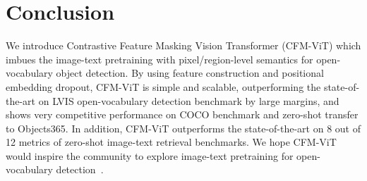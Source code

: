 \documentclass[10pt,twocolumn,letterpaper]{article}
\newcommand{\ours}{CFM-ViT\xspace}
\begin{document}
\section{Conclusion}
\vspace{-1mm}

\label{sec:conclusion}
We introduce Contrastive Feature Masking Vision Transformer (\ours) which imbues the image-text pretraining with pixel/region-level semantics for open-vocabulary object detection. By using feature construction and positional embedding dropout, \ours is simple and scalable, outperforming the state-of-the-art on LVIS open-vocabulary detection benchmark by large margins, and shows very competitive performance on COCO benchmark and zero-shot transfer to Objects365. In addition, \ours outperforms the state-of-the-art on 8 out of 12 metrics of zero-shot image-text retrieval benchmarks. We hope \ours would inspire the community to explore image-text pretraining for open-vocabulary detection~\cite{kim2023region}.

 



{\small


}
\end{document}
